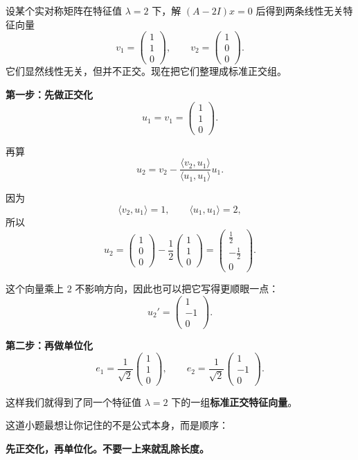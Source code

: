 \documentclass[11pt,oneside,UTF8]{ctexbook}
\newcommand{\important}[1]{\textcolor{Sakura}{\textbf{#1}}}
\begin{document}
\begin{examplebox}
设某个实对称矩阵在特征值 \(\lambda=2\) 下，解 \((A-2I)x=0\) 后得到两条线性无关特征向量
\[
v_1=
\begin{pmatrix}
1\\1\\0
\end{pmatrix},
\qquad
v_2=
\begin{pmatrix}
1\\0\\0
\end{pmatrix}.
\]
它们显然线性无关，但并不正交。现在把它们整理成标准正交组。

\textbf{第一步：先做正交化}
\[
u_1=v_1=
\begin{pmatrix}
1\\1\\0
\end{pmatrix}.
\]

再算
\[
u_2=v_2-\frac{\langle v_2,u_1\rangle}{\langle u_1,u_1\rangle}u_1.
\]

因为
\[
\langle v_2,u_1\rangle=1,\qquad
\langle u_1,u_1\rangle=2,
\]
所以
\[
u_2=
\begin{pmatrix}
1\\0\\0
\end{pmatrix}
-\frac12
\begin{pmatrix}
1\\1\\0
\end{pmatrix}
=
\begin{pmatrix}
\frac12\\[0.3em]-\frac12\\[0.3em]0
\end{pmatrix}.
\]

这个向量乘上 \(2\) 不影响方向，因此也可以把它写得更顺眼一点：
\[
u_2'=
\begin{pmatrix}
1\\-1\\0
\end{pmatrix}.
\]

\textbf{第二步：再做单位化}
\[
e_1=\frac{1}{\sqrt2}
\begin{pmatrix}
1\\1\\0
\end{pmatrix},
\qquad
e_2=\frac{1}{\sqrt2}
\begin{pmatrix}
1\\-1\\0
\end{pmatrix}.
\]

这样我们就得到了同一个特征值 \(\lambda=2\) 下的一组\important{标准正交特征向量}。

这道小题最想让你记住的不是公式本身，而是顺序：
\begin{center}
\important{先正交化，再单位化。不要一上来就乱除长度。}
\end{center}
\end{examplebox}
\end{document}
